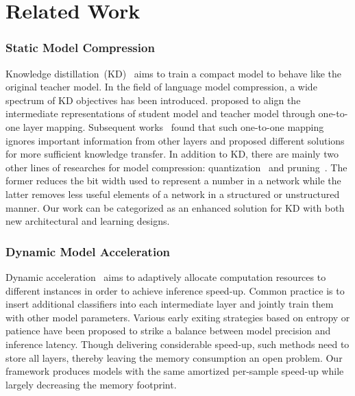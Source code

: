 \section{Related Work}
\subsubsection{Static Model Compression}
Knowledge distillation~(KD)~\cite{kd} aims to train a compact model to behave like the original teacher model. In the field of language model compression, a wide spectrum of KD objectives has been introduced. \citeauthor{pkd} proposed to 
align the intermediate representations of student model and teacher model through one-to-one layer mapping. Subsequent works~\cite{ckd,alpkd} found that such one-to-one mapping ignores 
important information from other layers and proposed different solutions for more sufficient knowledge transfer. In addition to KD, there are mainly two other lines of 
researches for model compression: quantization~\cite{quantization} and pruning~\cite{pruning}. The former reduces the bit width used to represent a number in a network while the latter removes less useful 
elements of a network in a structured or unstructured manner. Our work can be categorized as an enhanced solution for KD with both new architectural and learning designs.
\subsubsection{Dynamic Model Acceleration}
Dynamic acceleration~\cite{patience,gaml} aims to adaptively allocate computation resources to different instances in order to achieve inference speed-up. 
Common practice is to insert additional classifiers into each intermediate layer and jointly train them with other model parameters. Various early exiting strategies based on entropy or patience have been proposed to strike a balance 
between model precision and inference latency. Though delivering considerable speed-up, such methods need to store all layers, thereby leaving the memory consumption an open problem. Our framework produces models with the same amortized per-sample speed-up while largely decreasing the 
memory footprint.
